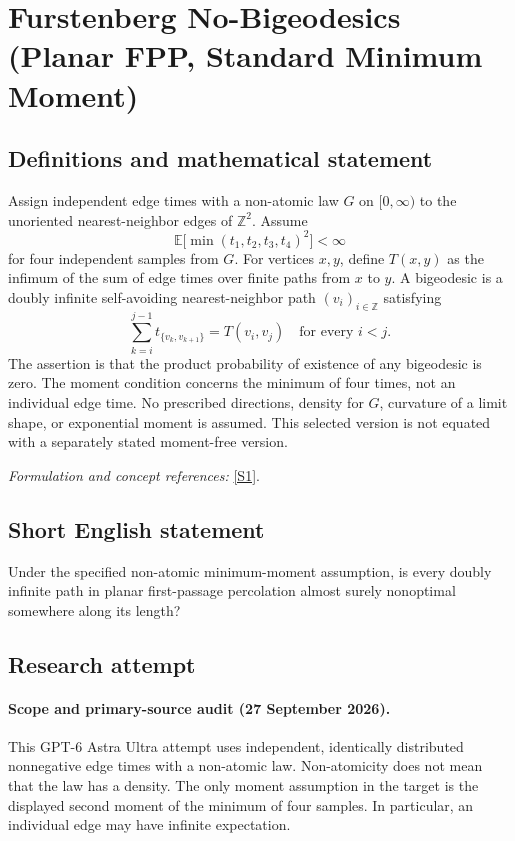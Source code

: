 \documentclass[11pt]{article}
\begin{document}
\section*{\texorpdfstring{Furstenberg No-Bigeodesics (Planar FPP, Standard Minimum Moment)}{Furstenberg No-Bigeodesics (Planar FPP, Standard Minimum Moment)}}\label{30006964}
\subsection{Definitions and mathematical statement}
Assign independent edge times with a non-atomic law $G$ on $[0,\infty)$ to the unoriented nearest-neighbor edges of ${\mathbb{Z}}^2$. Assume
\[
 {\mathbb{E}}\bigl[\min(t_1,t_2,t_3,t_4)^2\bigr]<\infty
\]
for four independent samples from $G$. For vertices $x,y$, define $T(x,y)$ as the infimum of the sum of edge times over finite paths from $x$ to $y$. A bigeodesic is a doubly infinite self-avoiding nearest-neighbor path $(v_i)_{i\in{\mathbb{Z}}}$ satisfying
\[
 \sum_{k=i}^{j-1}t_{\{v_k,v_{k+1}\}}=T(v_i,v_j)
 \quad\text{for every }i<j.
\]
The assertion is that the product probability of existence of any bigeodesic is zero. The moment condition concerns the minimum of four times, not an individual edge time. No prescribed directions, density for $G$, curvature of a limit shape, or exponential moment is assumed. This selected version is not equated with a separately stated moment-free version.
\par\smallskip\textit{Formulation and concept references:} \href{https://arxiv.org/pdf/1512.00804}{[S1]}.

\subsection{Short English statement}
Under the specified non-atomic minimum-moment assumption, is every doubly infinite path in planar first-passage percolation almost surely nonoptimal somewhere along its length?
\subsection{Research attempt}

\paragraph{Scope and primary-source audit (27 September 2026).}
This GPT-6 Astra Ultra attempt uses independent, identically distributed
nonnegative edge times with a non-atomic law. Non-atomicity does not mean
that the law has a density. The only moment assumption in the target is
the displayed second moment of the minimum of four samples. In particular,
an individual edge may have infinite expectation.
\end{document}
